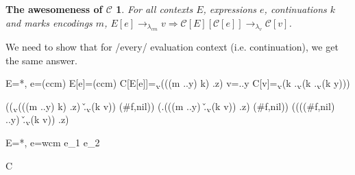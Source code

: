 \documentclass[ms,electronic,twosidetoc,letterpaper,chaptercenter,parttop]{byumsphd}
\begin{document}



\newtheorem*{maintheorem}{The awesomeness of $\mathcal{C}$}
\begin{maintheorem}
For all contexts $E$, expressions $e$, continuations $k$ and marks encodings $m$, $E[e]\rightarrow_{\lambda_{cm}}v\Rightarrow \mathcal{C}[E][\mathcal{C}[e]]\rightarrow_{\lambda_{v}}\mathcal{C}[v]$.
\end{maintheorem}








We need to show that for /every/ evaluation context (i.e. continuation), we get the same
answer.

E=*, e=(ccm)
E[e]=(ccm)
C[E[e]]=\k.\m.(((m \x.\y.y) k) \z.z)
v=\x.\y.y
C[v]=\k.\m.(k \x.\k.\m.(k \y.\k.\m.(k y)))

((\k.\m.(((m \x.\y.y) k) \z.z) \v.\k.\m.(k v)) (#f,nil))
(\m.(((m \x.\y.y) \v.\k.\m.(k v)) \z.z) (#f,nil))
((((#f,nil) \x.\y.y) \v.\k.\m.(k v)) \z.z)

E=*, e=wcm e_1 e_2

C
\end{document}
